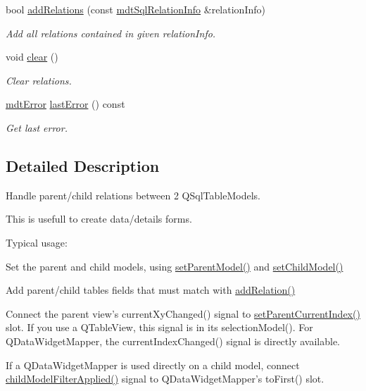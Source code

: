 \begin{DoxyCompactItemize}
bool \hyperlink{classmdt_sql_relation_ac43366a401dc567b9aafd16058010e5f}{add\-Relations} (const \hyperlink{classmdt_sql_relation_info}{mdt\-Sql\-Relation\-Info} \&relation\-Info)
\begin{DoxyCompactList}\small\item\em Add all relations contained in given relation\-Info. \end{DoxyCompactList}\item 
void \hyperlink{classmdt_sql_relation_a01469fb1baf7327ca6ddbcd1595e0d7c}{clear} ()
\begin{DoxyCompactList}\small\item\em Clear relations. \end{DoxyCompactList}\item 
\hyperlink{classmdt_error}{mdt\-Error} \hyperlink{classmdt_sql_relation_a51cf2e1741445d465456d71293a738cc}{last\-Error} () const 
\begin{DoxyCompactList}\small\item\em Get last error. \end{DoxyCompactList}\end{DoxyCompactItemize}


\subsection{Detailed Description}
Handle parent/child relations between 2 Q\-Sql\-Table\-Models. 

This is usefull to create data/details forms.

Typical usage\-:
\begin{DoxyItemize}
\item Set the parent and child models, using \hyperlink{classmdt_sql_relation_a5ac3a82c5d3e33b5e40b86acfe7e2a03}{set\-Parent\-Model()} and \hyperlink{classmdt_sql_relation_ad74021dcf86c528044bf67220ed36833}{set\-Child\-Model()}
\item Add parent/child tables fields that must match with \hyperlink{classmdt_sql_relation_a53c649cbf59fef6ea61dd9f2ab40d770}{add\-Relation()}
\item Connect the parent view's current\-Xy\-Changed() signal to \hyperlink{classmdt_sql_relation_a39fbecb027a5783277df1cc995485917}{set\-Parent\-Current\-Index()} slot. If you use a Q\-Table\-View, this signal is in its selection\-Model(). For Q\-Data\-Widget\-Mapper, the current\-Index\-Changed() signal is directly available.
\item If a Q\-Data\-Widget\-Mapper is used directly on a child model, connect \hyperlink{classmdt_sql_relation_a86656619d8156638ebfbde2b334d40e2}{child\-Model\-Filter\-Applied()} signal to Q\-Data\-Widget\-Mapper's to\-First() slot. 
\end{DoxyItemize}

